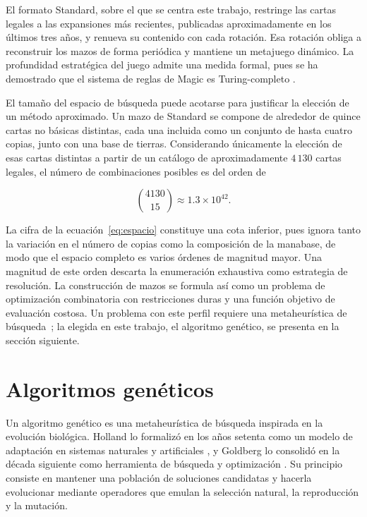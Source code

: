El formato Standard, sobre el que se centra este trabajo, restringe las cartas legales a las expansiones más recientes, publicadas aproximadamente en los últimos tres años, y renueva su contenido con cada rotación. Esa rotación obliga a reconstruir los mazos de forma periódica y mantiene un metajuego dinámico. La profundidad estratégica del juego admite una medida formal, pues se ha demostrado que el sistema de reglas de Magic es Turing-completo \cite{churchill2019}.

El tamaño del espacio de búsqueda puede acotarse para justificar la elección de un método aproximado. Un mazo de Standard se compone de alrededor de quince cartas no básicas distintas, cada una incluida como un conjunto de hasta cuatro copias, junto con una base de tierras. Considerando únicamente la elección de esas cartas distintas a partir de un catálogo de aproximadamente $4\,130$ cartas legales, el número de combinaciones posibles es del orden de

\begin{equation}
\binom{4130}{15} \approx 1.3 \times 10^{42}.
\label{eq:espacio}
\end{equation}

La cifra de la ecuación~\ref{eq:espacio} constituye una cota inferior, pues ignora tanto la variación en el número de copias como la composición de la manabase, de modo que el espacio completo es varios órdenes de magnitud mayor. Una magnitud de este orden descarta la enumeración exhaustiva como estrategia de resolución. La construcción de mazos se formula así como un problema de optimización combinatoria con restricciones duras y una función objetivo de evaluación costosa. Un problema con este perfil requiere una metaheurística de búsqueda~\cite{blum2003}; la elegida en este trabajo, el algoritmo genético, se presenta en la sección siguiente.

\section{Algoritmos genéticos}
\label{sec:ga}

Un algoritmo genético es una metaheurística de búsqueda inspirada en la evolución biológica. Holland lo formalizó en los años setenta como un modelo de adaptación en sistemas naturales y artificiales \cite{holland1975}, y Goldberg lo consolidó en la década siguiente como herramienta de búsqueda y optimización \cite{goldberg1989}. Su principio consiste en mantener una población de soluciones candidatas y hacerla evolucionar mediante operadores que emulan la selección natural, la reproducción y la mutación.

